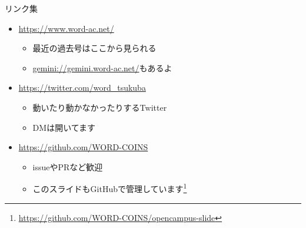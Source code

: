\documentclass[lualatex]{beamer}
\begin{document}
\begin{frame}[plain]{リンク集}
 \begin{itemize}
  \item \url{https://www.word-ac.net/}
  \begin{itemize}
   \item 最近の過去号はここから見られる
   \item \url{gemini://gemini.word-ac.net/}もあるよ
  \end{itemize}
  \item \url{https://twitter.com/word\_tsukuba}
  \begin{itemize}
   \item 動いたり動かなかったりするTwitter
   \item DMは開いてます
  \end{itemize}
  \item \url{https://github.com/WORD-COINS}
  \begin{itemize}
   \item issueやPRなど歓迎
   \item このスライドもGitHubで管理しています\footnote{\url{https://github.com/WORD-COINS/opencampus-slide}}
  \end{itemize}
 \end{itemize}
\end{frame}
\end{document}
